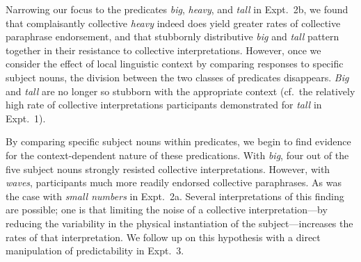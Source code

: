 \documentclass[preprint,12pt,authoryear,titlepage]{elsarticle}
\newcommand{\ndg}[1]{\textcolor{Green}{[ndg: #1]}}
\begin{document}

Narrowing our focus to the predicates \emph{big}, \emph{heavy}, and \emph{tall} in Expt.~2b, we found that complaisantly collective \emph{heavy} indeed does yield greater rates of collective paraphrase endorsement, and that stubbornly distributive \emph{big} and \emph{tall} pattern together in their resistance to collective interpretations. However, once we consider the effect of local linguistic context by comparing responses to specific subject nouns, the division between the two classes of predicates disappears. \emph{Big} and \emph{tall} are no longer so stubborn with the appropriate context (cf.~the relatively high rate of collective interpretations participants demonstrated for \emph{tall} in Expt.~1).



By comparing specific subject nouns within predicates, we begin to find evidence for the context-dependent nature of these predications. With \emph{big}, four out of the five subject nouns strongly resisted collective interpretations. However, with \emph{waves}, participants much more readily endorsed collective paraphrases. As was the case with \emph{small numbers} in Expt.~2a. Several interpretations of this finding are possible; one is that limiting the noise of a collective interpretation---by reducing the variability in the physical instantiation of the subject---increases the rates of that interpretation. We follow up on this hypothesis with a direct manipulation of predictability in Expt.~3.
\end{document}

